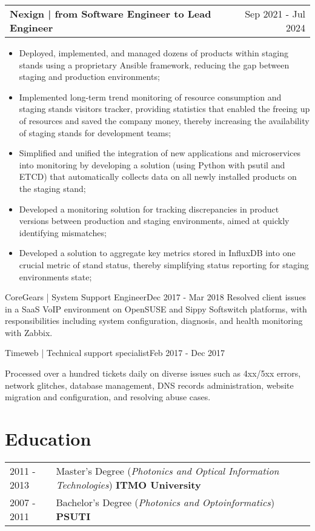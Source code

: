 \documentclass[a4paper,12pt]{article}
\makeatletter
\newenvironment{joblong}[2]
    {
    \begin{tabularx}{\linewidth}{@{}l X r@{}}
    \textbf{#1} & \hfill &  #2 \\[3.75pt]
    \end{tabularx}
    \begin{minipage}[t]{\linewidth}
    \begin{itemize}[nosep,after=\strut, leftmargin=1em, itemsep=3pt,label=--]
    }
    {
    \end{itemize}
    \end{minipage}    
    }
\makeatother
\begin{document}
\begin{joblong}{Nexign | from Software Engineer to Lead Engineer }{Sep 2021 - Jul 2024}
\item Deployed, implemented, and managed dozens of products within staging stands using a proprietary Ansible framework, reducing the gap between staging and production environments;
\item Implemented long-term trend monitoring of resource consumption and staging stands visitors tracker, providing statistics that enabled the freeing up of resources and saved the company money, thereby increasing the availability of staging stands for development teams;
\item Simplified and unified the integration of new applications and microservices into monitoring by developing a solution (using Python with psutil and ETCD) that automatically collects data on all newly installed products on the staging stand;
\item Developed a monitoring solution for tracking discrepancies in product versions between production and staging environments, aimed at quickly identifying mismatches;
\item Developed a solution to aggregate key metrics stored in InfluxDB into one crucial metric of stand status, thereby simplifying status reporting for staging environments state;
\end{joblong}

\begin{shortlong}{CoreGears | System Support Engineer}{Dec 2017 - Mar 2018}
Resolved client issues in a SaaS VoIP environment on OpenSUSE and Sippy Softswitch platforms, with responsibilities including system configuration, diagnosis, and health monitoring with Zabbix.
\end{shortlong}

\begin{shortlong}{Timeweb | Technical support specialist}{Feb 2017 - Dec 2017}
\item Processed over a hundred tickets daily on diverse issues such as 4xx/5xx errors, network glitches, database management, DNS records administration, website migration and configuration, and resolving abuse cases.
\end{shortlong}

\section{Education}
\begin{tabularx}{\linewidth}{@{}l X@{}}	
2011 - 2013 & Master’s Degree (\textit{Photonics and Optical Information Technologies}) \hfill \textbf{ITMO University}  \\ 
2007 - 2011 & Bachelor's Degree (\textit{Photonics and Optoinformatics}) \hfill \textbf{PSUTI} \\ 
\end{tabularx}
\end{document}
